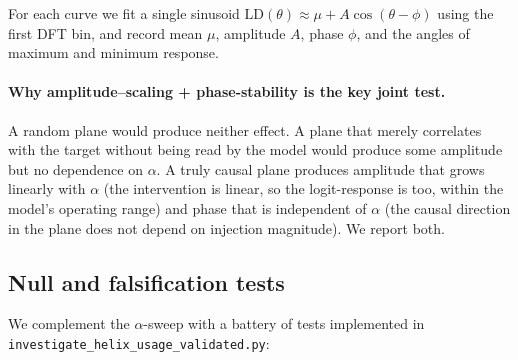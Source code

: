 For each curve we fit a single sinusoid
$\mathrm{LD}(\theta) \approx \mu + A\cos(\theta - \phi)$
using the first DFT bin, and record mean $\mu$, amplitude $A$, phase $\phi$,
and the angles of maximum and minimum response.

\paragraph{Why amplitude--scaling + phase-stability is the key joint test.}
A random plane would produce neither effect. A plane that merely
correlates with the target without being read by the model would produce
some amplitude but no dependence on $\alpha$. A truly causal plane
produces amplitude that grows linearly with $\alpha$ (the intervention is
linear, so the logit-response is too, within the model's operating
range) and phase that is independent of $\alpha$ (the causal direction in
the plane does not depend on injection magnitude). We report both.

\subsection{Null and falsification tests}
\label{sec:nulls}

We complement the $\alpha$-sweep with a battery of tests implemented in
\texttt{investigate\_helix\_usage\_validated.py}:

